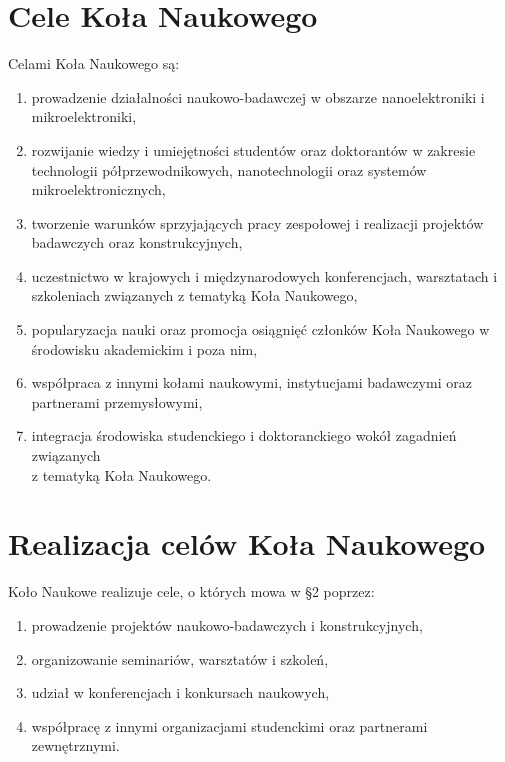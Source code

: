 \documentclass[12pt,a4paper]{article}
\begin{document}
\section{Cele Koła Naukowego}
Celami Koła Naukowego są:
    \begin{enumerate}
        \item prowadzenie działalności naukowo-badawczej w obszarze nanoelektroniki i mikroelektroniki,
        \item rozwijanie wiedzy i umiejętności studentów oraz doktorantów w zakresie technologii półprzewodnikowych, nanotechnologii oraz systemów mikroelektronicznych,
        \item tworzenie warunków sprzyjających pracy zespołowej i realizacji projektów badawczych oraz konstrukcyjnych,
        \item uczestnictwo w krajowych i międzynarodowych konferencjach, warsztatach i szkoleniach związanych z tematyką Koła Naukowego,
        \item popularyzacja nauki oraz promocja osiągnięć członków Koła Naukowego w środowisku akademickim i poza nim,
        \item współpraca z innymi kołami naukowymi, instytucjami badawczymi oraz partnerami przemysłowymi,
        \item integracja środowiska studenckiego i doktoranckiego wokół zagadnień związanych \\ z tematyką Koła Naukowego.
    \end{enumerate}

\newpage

\section{Realizacja celów Koła Naukowego}
Koło Naukowe realizuje cele, o których mowa w \S 2 poprzez:
    \begin{enumerate}
        \item prowadzenie projektów naukowo-badawczych i konstrukcyjnych,
        \item organizowanie seminariów, warsztatów i szkoleń,
        \item udział w konferencjach i konkursach naukowych,
        \item współpracę z innymi organizacjami studenckimi oraz partnerami zewnętrznymi.
    \end{enumerate}
\end{document}
